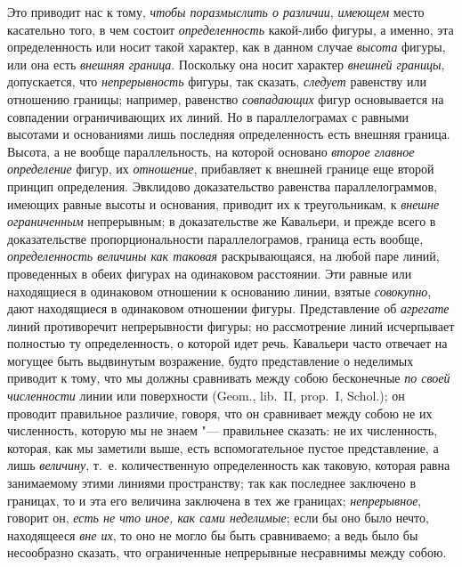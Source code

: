 Это приводит нас к тому, {\em чтобы поразмыслить о
различии}, {\em имеющем} место касательно того, в чем
состоит {\em определенность} какой-либо фигуры, а
именно, эта определенность или носит такой характер, как в данном случае
{\em высота} фигуры, или она есть
{\em внешняя граница}. Поскольку она носит характер
{\em внешней границы}, допускается, что
{\em непрерывность} фигуры, так сказать,
{\em следует} равенству или отношению границы;
например, равенство {\em совпадающих} фигур
основывается на совпадении ограничивающих их линий. Но в параллелограмах с
равными высотами и основаниями лишь последняя определенность есть внешняя
граница. Высота, а не вообще параллельность, на которой основано
{\em второе главное определение} фигур, их
{\em отношение}, прибавляет к внешней границе еще
второй принцип определения. Эвклидово доказательство равенства
параллелограммов, имеющих равные высоты и основания, приводит их к
треугольникам, к {\em внешне ограниченным} непрерывным;
в доказательстве же Кавальери, и прежде всего в доказательстве
пропорциональности параллелограмов, граница есть вообще,
{\em определенность величины как таковая}
раскрывающаяся, на любой паре линий, проведенных в обеих фигурах на
одинаковом расстоянии. Эти равные или находящиеся в одинаковом отношении к
основанию линии, взятые {\em совокупно}, дают
находящиеся в одинаковом отношении фигуры. Представление об
{\em агрегате} линий противоречит непрерывности фигуры;
но рассмотрение линий исчерпывает полностью ту определенность, о которой
идет речь. Кавальери часто отвечает на могущее быть выдвинутым возражение,
будто представление о неделимых приводит к тому, что мы должны сравнивать
между собою бесконечные {\em по своей численности}
линии или поверхности (Geom., lib.~II, prop.~I, Schol.); он проводит
правильное различие, говоря, что он сравнивает между собою не их
численность, которую мы не знаем "--- правильнее сказать: не их численность,
которая, как мы заметили выше, есть вспомогательное пустое представление, а
лишь {\em величину}, т.~е. количественную
определенность как таковую, которая равна занимаемому этими линиями
пространству; так как последнее заключено в границах, то и эта его величина
заключена в тех же границах; {\em непрерывное}, говорит
он, {\em есть не что иное, как сами неделимые}; если бы оно было нечто,
находящееся {\em вне их}, то оно не могло бы быть сравниваемо; а
ведь было бы несообразно сказать, что ограниченные непрерывные несравнимы
между собою.


